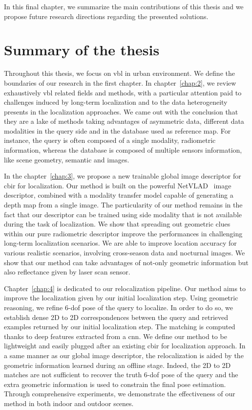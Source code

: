In this final chapter, we summarize the main contributions of this thesis and we propose future research directions regarding the presented solutions.

\section{Summary of the thesis}

Throughout this thesis, we focus on \ac{vbl} in urban environment. We define the boundaries of our research in the first chapter. In chapter~\ref{chap:2}, we review exhaustively \ac{vbl} related fields and methods, with a particular attention paid to challenges induced by long-term localization and to the data heterogeneity presents in the localization approaches. We came out with the conclusion that they are a lake of methods taking advantages of asymmetric data, \ie different data modalities in the query side and in the database used as reference map. For instance, the query is often composed of a single modality, radiometric information, whereas the database is composed of multiple sensors information, like scene geometry, semantic and images.

In the chapter~\ref{chap:3}, we propose a new trainable global image descriptor for \ac{cbir} for localization. Our method is built on the powerful NetVLAD~\citep{Arandjelovic2017} image descriptor, combined with a modality transfer model capable of generating a depth map from a single image. The particularity of our method remains in the fact that our descriptor can be trained using side modality that is not available during the task of localization. We show that spreading out geometric clues within our pure radiometric descriptor improve the performances in challenging long-term localization scenarios. We are able to improve location accuracy for various realistic scenarios, involving cross-season data and nocturnal images. We show that our method can take advantages of not-only geometric information but also reflectance given by laser scan sensor.

Chapter~\ref{chap:4} is dedicated to our relocalization pipeline. Our method aims to improve the localization given by our initial localization step. Using geometric reasoning, we refine 6-\ac{dof} pose of the query to localize. In order to do so, we establish dense 2D to 2D correspondences between the query and retrieved examples returned by our initial localization step. The matching is computed thanks to deep features extracted from a \ac{cnn}. We define our method to be lightweight and easily plugged after an existing \ac{cbir} for localization approach. In a same manner as our global image descriptor, the relocalization is aided by the geometric information learned during an offline stage. Indeed, the 2D to 2D matches are not sufficient to recover the truth  6-\ac{dof} pose of the query and the extra geometric information is used to constrain the final pose estimation. Through comprehensive experiments, we demonstrate the effectiveness of our method in both indoor and outdoor scenes.
